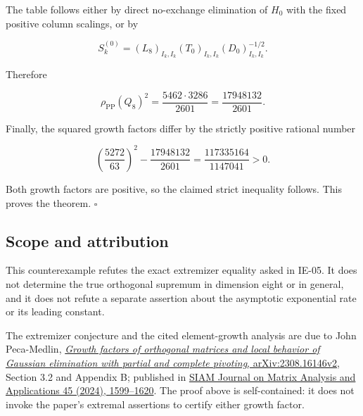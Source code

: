 \documentclass[10pt,a4paper]{article}
\begin{document}
The table follows either by direct no-exchange elimination of \(H_0\)
with the fixed positive column scalings, or by

\nopagebreak[4]

\[
S_k^{(0)}=(L_8)_{I_k,I_k}(T_0)_{I_k,I_k}(D_0)_{I_k,I_k}^{-1/2}.
\]

Therefore

\nopagebreak[4]

\[
\rho_{\mathrm{PP}}(Q_8)^2
=\frac{5462\cdot3286}{2601}
=\frac{17948132}{2601}.
\]

Finally, the squared growth factors differ by the strictly positive
rational number

\nopagebreak[4]

\[
\left(\frac{5272}{63}\right)^2
-\frac{17948132}{2601}
=\frac{117335164}{1147041}>0.
\]

Both growth factors are positive, so the claimed strict inequality
follows. This proves the theorem. \(\square\)

\subsection{Scope and attribution}\label{scope-and-attribution}

This counterexample refutes the exact extremizer equality asked in
IE-05. It does not determine the true orthogonal supremum in dimension
eight or in general, and it does not refute a separate assertion about
the asymptotic exponential rate or its leading constant.

The extremizer conjecture and the cited element-growth analysis are due
to John Peca-Medlin,
\href{https://arxiv.org/html/2308.16146v2}{\emph{Growth factors of
orthogonal matrices and local behavior of Gaussian elimination with
partial and complete pivoting}, arXiv:2308.16146v2}, Section 3.2 and
Appendix B; published in \href{https://doi.org/10.1137/23M1597733}{SIAM
Journal on Matrix Analysis and Applications 45 (2024), 1599--1620}. The
proof above is self-contained: it does not invoke the paper's extremal
assertions to certify either growth factor.
\end{document}
